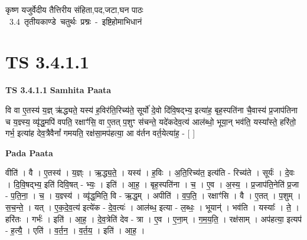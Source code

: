 \documentclass[17pt]{extarticle}
\begin{document}
\begin{titlepage}
    \begin{center}
 
\begin{sanskrit}
    { \Large
    कृष्ण यजुर्वेदीय तैत्तिरीय संहिता,पद,जटा,घन पाठः 
    }
    \\
    \vspace{2.5cm}
    \mbox{ \Large
    3.4      तृतीयकाण्डे चतुर्थः प्रश्नः - इष्टिहोमाभिधानं   }
\end{sanskrit}
\end{center}

\end{titlepage}
\tableofcontents
{}
\pagebreak


\section{ TS 3.4.1.1 }

\textbf{TS 3.4.1.1 } \newline
\textbf{Samhita Paata} \newline

वि वा ए॒तस्य॑ य॒ज्ञ् ऋ॑द्ध्यते॒ यस्य॑ ह॒विर॑ति॒रिच्य॑ते॒ सूर्यो॑ दे॒वो दि॑वि॒षद्भ्य॒ इत्या॑ह॒ बृह॒स्पति॑ना चै॒वास्य॑ प्र॒जाप॑तिना च य॒ज्ञ्स्य॒ व्यृ॑द्ध॒मपि॑ वपति॒ रक्षाꣳ॑सि॒ वा ए॒तत् प॒शुꣳ स॑चन्ते॒ यदे॑कदेव॒त्य॑ आल॑ब्धो॒ भूया॒न् भव॑ति॒ यस्या᳚स्ते॒ हरि॑तो॒ गर्भ॒ इत्या॑ह देव॒त्रैवैनां᳚ गमयति॒ रक्ष॑सा॒मप॑हत्या॒ आ व॑र्तन वर्त॒येत्या॑ह॒ - [  ] \newline

\textbf{Pada Paata} \newline

वीति॑ । वै । ए॒तस्य॑ । य॒ज्ञ्ः । ऋ॒द्ध्य॒ते॒ । यस्य॑ । ह॒विः । अ॒ति॒रिच्य॑त॒ इत्य॑ति - रिच्य॑ते । सूर्यः॑ । दे॒वः । दि॒वि॒षद्भ्य॒ इति॑ दिवि॒षत् - भ्यः॒ । इति॑ । आ॒ह॒ । बृह॒स्पति॑ना । च॒ । ए॒व । अ॒स्य॒ । प्र॒जाप॑ति॒नेति॑ प्र॒जा - प॒ति॒ना॒ । च॒ । य॒ज्ञ्स्य॑ । व्यृ॑द्ध॒मिति॒ वि - ऋ॒द्ध॒म् । अपीति॑ । व॒प॒ति॒ । रक्षाꣳ॑सि । वै । ए॒तत् । प॒शुम् । स॒च॒न्ते॒ । यत् । ए॒क॒दे॒व॒त्य॑ इत्ये॑क - दे॒व॒त्यः॑ । आल॑ब्ध॒ इत्या - ल॒ब्धः॒ । भूयान्॑ । भव॑ति । यस्याः᳚ । ते॒ । हरि॑तः । गर्भः॑ । इति॑ । आ॒ह॒ । दे॒व॒त्रेति॑ देव - त्रा । ए॒व । ए॒ना॒म् । ग॒म॒य॒ति॒ । रक्ष॑साम् । अप॑हत्या॒ इत्यप॑ - ह॒त्यै॒ । एति॑ । व॒र्त॒न॒ । व॒र्त॒य॒ । इति॑ । आ॒ह॒ ।  \newline




\end{document}
